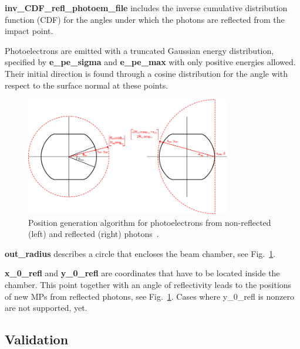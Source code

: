 \textbf{inv\_CDF\_refl\_photoem\_file} includes the inverse cumulative distribution function (CDF) for the angles under which the photons are reflected from the impact point.

Photoelectrons are emitted with a truncated Gaussian energy distribution, specified by \textbf{e\_pe\_sigma} and \textbf{e\_pe\_max} with only positive energies allowed.
Their initial direction is found through a cosine distribution for the angle with respect to the surface normal at these points.
\begin{figure}[tbh]
    \centering
    \includegraphics[width=0.8\textwidth]{../ss/gianni_thesis_photoelectrons.png}
    \caption{Position generation algorithm for photoelectrons from non-reflected (left) and reflected (right) photons~\cite{gianni}.}
    \label{fig:gt}
\end{figure}


\textbf{out\_radius} describes a circle that encloses the beam chamber, see Fig.~\ref{fig:gt}.

\textbf{x\_0\_refl} and \textbf{y\_0\_refl} are coordinates that have to be located inside the chamber.
This point together with an angle of reflectivity leads to the positions of new MPs from reflected photons, see Fig.~\ref{fig:gt}.
Cases where y\_0\_refl is nonzero are not supported, yet.

\subsection{Validation}

